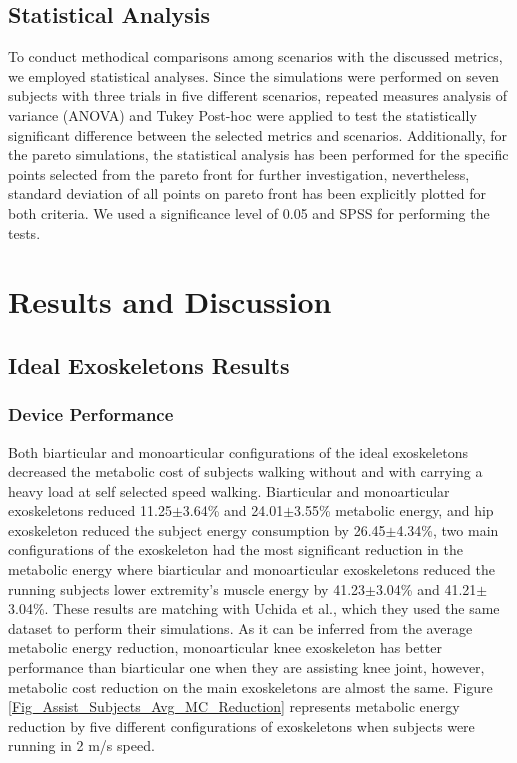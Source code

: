 \documentclass[10pt,letterpaper]{article}
\begin{document}
\subsection*{Statistical Analysis}
To conduct methodical comparisons among scenarios with the discussed metrics, we employed statistical analyses. Since the simulations were performed on seven subjects with three trials in five different scenarios, repeated measures analysis of variance (ANOVA) and Tukey Post-hoc were applied to test the statistically significant difference between the selected metrics and scenarios.  Additionally, for the pareto simulations, the statistical analysis has been performed for the specific points selected from the pareto front for further investigation, nevertheless, standard deviation of all points on pareto front has been explicitly plotted for both criteria. We used a significance level of 0.05 and SPSS \cite{spss} for performing the tests.
\section*{Results and Discussion}
\subsection*{Ideal Exoskeletons Results}
\subsubsection*{Device Performance}
Both biarticular and monoarticular configurations of the ideal exoskeletons decreased the metabolic cost of subjects walking without and with carrying a heavy load at self selected speed walking. Biarticular and monoarticular exoskeletons reduced 11.25$\pm$3.64\% and 24.01$\pm$3.55\% metabolic energy, and hip exoskeleton reduced the subject energy consumption by 26.45$\pm$4.34\%, two main configurations of the exoskeleton had the most significant reduction in the metabolic energy where biarticular and monoarticular exoskeletons reduced the running subjects lower extremity's muscle energy by 41.23$\pm$3.04\% and 41.21$\pm$3.04\%. These results are matching with Uchida et al.\cite{2}, which they used the same dataset to perform their simulations. As it can be inferred from the average metabolic energy reduction, monoarticular knee exoskeleton has better performance than biarticular one when they are assisting knee joint, however, metabolic cost reduction on the main exoskeletons are almost the same. Figure \ref{Fig_Assist_Subjects_Avg_MC_Reduction} represents metabolic energy reduction by five different configurations of exoskeletons when subjects were running in 2 m/s speed.\\
\end{document}
